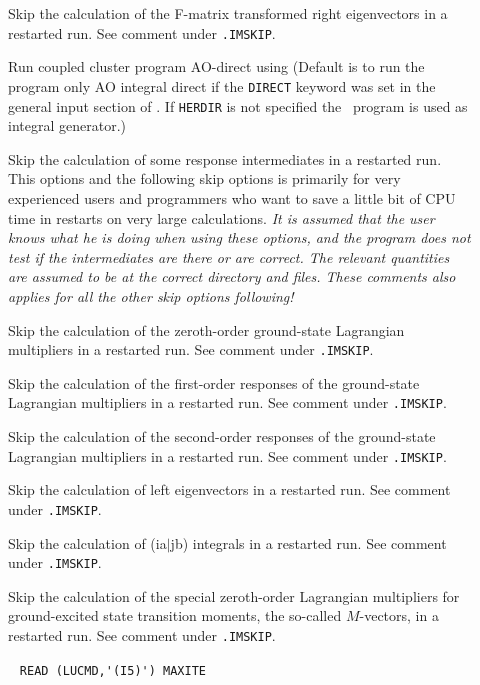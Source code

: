 \begin{description}
\item[] 
   Skip the calculation of the F-matrix transformed right eigenvectors
   in a restarted run. See comment under \verb|.IMSKIP|.
%
\item[] 
       Run coupled cluster program AO-direct
       using {\her}
       (Default is to run the program only AO integral direct
       if the \verb+DIRECT+ keyword was set in the general
       input section of \siraba . If \verb+HERDIR+ is not specified the \eri\
       program is used as integral generator.) 
%
\item[] 
   Skip the calculation of some response intermediates in a restarted run.
   This options and the following skip options is primarily for very experienced users 
   and programmers who want to save a little bit of CPU time in restarts on very large 
   calculations. 
   {\em It is assumed that the user knows what he is doing when using these options, and
   the program does not test if the intermediates are there or are correct. 
   The relevant quantities are assumed to be at the correct directory and files.
   These comments also applies for all the other skip options following! }
%
\item[]  
   Skip the calculation of the zeroth-order ground-state Lagrangian
   multipliers in a restarted run. See comment under \verb|.IMSKIP|.
%
\item[] 
   Skip the calculation of the first-order responses of the 
   ground-state Lagrangian multipliers in a restarted run. See comment under \verb|.IMSKIP|.
%
\item[]  
   Skip the calculation of the second-order responses of the 
   ground-state Lagrangian multipliers in a restarted run. See comment under \verb|.IMSKIP|.
%
\item[]  
   Skip the calculation of left eigenvectors
   in a restarted run. See comment under \verb|.IMSKIP|.
%
\item[] 
   Skip the calculation of (ia$\mid$jb) integrals in a restarted run. See comment under \verb|.IMSKIP|.
%
\item[] 
   Skip the calculation of the special zeroth-order Lagrangian 
   multipliers for ground-excited state transition moments,
   the so-called $M$-vectors, in a restarted run. See comment under \verb|.IMSKIP|.
%
\item[] \verb| |\newline
  \verb|READ (LUCMD,'(I5)') MAXITE|


\end{description}

